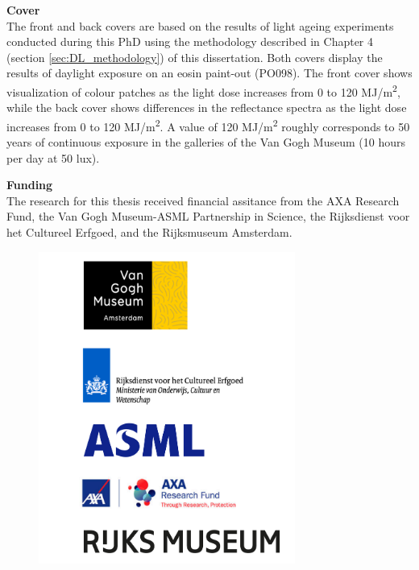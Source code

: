 \vspace{0.5cm}

\textbf{Cover} \\

The front and back covers are based on the results of light ageing experiments conducted during this PhD using the methodology described in Chapter 4 (section \ref{sec:DL_methodology}) of this dissertation. Both covers display the results of daylight exposure on an eosin paint-out (PO098). The front cover shows visualization of colour patches as the light dose increases from 0 to 120 MJ/m\textsuperscript{2}, while the back cover shows differences in the reflectance spectra as the light dose increases from 0 to 120 MJ/m\textsuperscript{2}. A value of 120 MJ/m\textsuperscript{2} roughly corresponds to 50 years of continuous exposure in the galleries of the Van Gogh Museum (10 hours per day at 50 lux).









\newpage
{\Large\textbf{Funding}}\\

The research for this thesis received financial assitance from the AXA Research Fund, the Van Gogh Museum-ASML Partnership in Science, the Rijksdienst voor het Cultureel Erfgoed, and the Rijksmuseum Amsterdam. 

\vspace{1.5cm}

\begin{figure}[!h]
\centering
\includegraphics[width=0.75\textwidth]{Logo_institutions.png}
\label{fig:colours_description}
\end{figure}

\newpage
